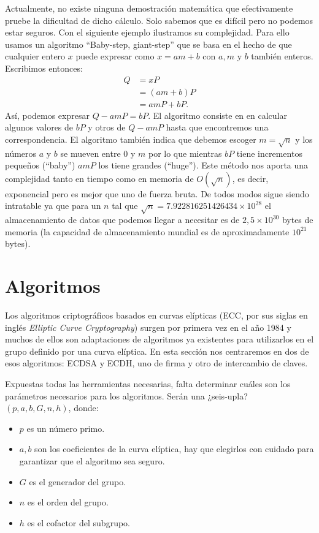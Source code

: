 \documentclass[11pt]{article}
\begin{document}
Actualmente, no existe ninguna demostración matemática que efectivamente pruebe la dificultad de dicho cálculo. Solo sabemos que es difícil pero no podemos estar seguros. Con el siguiente ejemplo ilustramos su complejidad. Para ello usamos un algoritmo ``Baby-step, giant-step'' que se basa en el hecho de que cualquier entero $ x $ puede expresar como $ x = am+b $ con $ a,m \text{ y } b$ también enteros. Escribimos entonces:
\begin{equation*}
\begin{split}
Q &= xP \\
  &= (am+b)P\\
  &=amP + bP.
\end{split}
\end{equation*}
Así, podemos expresar $ Q - amP  = bP $. El algoritmo consiste en en calcular algunos valores de $ bP $ y otros de $ Q-amP $ hasta que encontremos una correspondencia. El algoritmo también indica que debemos escoger $ m = \sqrt{n} $ y los números $ a $ y $ b $ se mueven entre 0 y $ m $ por lo que mientras $ bP $ tiene incrementos pequeños (``baby'') $ amP $ los tiene grandes (``huge''). Este método nos aporta una complejidad tanto en tiempo como en memoria de $ O(\sqrt{n}) $, es decir, exponencial pero es mejor que uno de fuerza bruta. De todos modos sigue siendo intratable ya que para un $  n  $ tal que $ \sqrt{n} = 7.922816251426434 \times 10^{28} $ el almacenamiento de datos que podemos llegar a necesitar es de $ 2,5\times10^{30} $ bytes de memoria (la capacidad de almacenamiento mundial es de aproximadamente $ 10^{21} $ bytes). \\

\section{Algoritmos}

Los algoritmos criptográficos basados en curvas elípticas (ECC, por sus siglas en inglés \textit{Elliptic Curve Cryptography}) surgen por primera vez en el año 1984 y muchos de ellos son adaptaciones de algoritmos ya existentes para utilizarlos en el grupo definido por una curva elíptica. En esta sección nos centraremos en dos de esos algoritmos: ECDSA y ECDH, uno de firma y otro de intercambio de claves.

Expuestas todas las herramientas necesarias, falta determinar cuáles son los parámetros necesarios para los algoritmos. Serán una ¿seis-upla? $ (p, a, b, G, n, h) $, donde:
\begin{itemize}
	\item $ p $ es un número primo.
	\item $ a, b $ son los coeficientes de la curva elíptica, hay que elegirlos con cuidado para garantizar que el algoritmo sea seguro.
	\item $ G $ es el generador del grupo.
	\item $ n $ es el orden del grupo.
	\item $ h $ es el cofactor del subgrupo.
\end{itemize}
\end{document}
